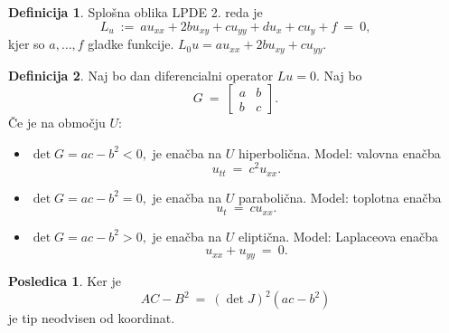 \documentclass[11pt]{article}
\newcommand{\0}{\mathbf{0}}
\theoremstyle{definition}
\newtheorem{definicija}{Definicija}[section]
\theoremstyle{definition}
\theoremstyle{definition}
\theoremstyle{definition}
\newtheorem*{posledica}{Posledica}
\begin{document}
\begin{definicija}

Splošna oblika LPDE 2. reda je
$$L_u ~:=~ a u_{xx} + 2b u_{xy} + c u_{yy} + d u_x + c u_y + f ~=~ 0,$$
kjer so $a,\ldots,f$ gladke funkcije. $L_0 u = a u_{xx} + 2b u_{xy} + c u_{yy}$.

\end{definicija}
\vspace{0.5cm}

\begin{definicija}

Naj bo dan diferencialni operator $Lu = 0$. Naj bo
$$G ~=~ \begin{bmatrix}
a & b \\
b & c
\end{bmatrix}.$$
Če je na območju $U$:
\begin{itemize}
	\item $\det{G} = ac - b^2 < 0,$ je enačba na $U$ hiperbolična. Model: valovna enačba
	$$u_{tt} ~=~ c^2 u_{xx}.$$
	\item $\det{G} = ac - b^2 = 0,$ je enačba na $U$ parabolična. Model: toplotna enačba
	$$u_t ~=~ c u_{xx}.$$
	\item $\det{G} = ac - b^2 > 0,$ je enačba na $U$ eliptična. Model: Laplaceova enačba
	$$u_{xx} + u_{yy} ~=~ 0.$$
\end{itemize} 

\end{definicija}
\vspace{0.5cm}

\begin{posledica}

Ker je 
$$AC-B^2 ~=~ (\det{J})^2(ac-b^2)$$
je tip neodvisen od koordinat.

\end{posledica}
\vspace{0.5cm}

\pagebreak

\end{document}
